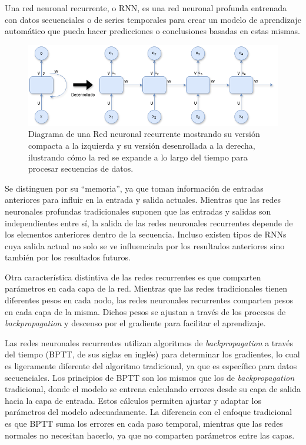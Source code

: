 Una red neuronal recurrente, o RNN, es una red neuronal profunda entrenada con datos secuenciales o de series temporales para crear un modelo de aprendizaje automático que pueda hacer predicciones o conclusiones basadas en estas mismas.

\begin{figure}[H]
    \centering
    \includegraphics[width=1\textwidth]{imagenes/RNN.drawio.png}
    \caption{Diagrama de una Red neuronal recurrente mostrando su versión compacta a la izquierda y su versión desenrollada a la derecha, ilustrando cómo la red se expande a lo largo del tiempo para procesar secuencias de datos.}
    \label{fig:rnn}
\end{figure}

Se distinguen por su “memoria”, ya que toman información de entradas anteriores para influir en la entrada y salida actuales. Mientras que las redes neuronales profundas tradicionales suponen que las entradas y salidas son independientes entre sí, la salida de las redes neuronales recurrentes depende de los elementos anteriores dentro de la secuencia. Incluso existen tipos de RNNs cuya salida actual no solo se ve influenciada por los resultados anteriores sino también por los resultados futuros.

Otra característica distintiva de las redes recurrentes es que comparten parámetros en cada capa de la red. Mientras que las redes tradicionales tienen diferentes pesos en cada nodo, las redes neuronales recurrentes comparten pesos en cada capa de la misma. Dichos pesos se ajustan a través de los procesos de \textit{backpropagation} y descenso por el gradiente para facilitar el aprendizaje.

Las redes neuronales recurrentes utilizan algoritmos de \textit{backpropagation} a través del tiempo (BPTT, de sus siglas en inglés) para determinar los gradientes, lo cual es ligeramente diferente del algoritmo tradicional, ya que es específico para datos secuenciales. Los principios de BPTT son los mismos que los de \textit{backpropagation} tradicional, donde el modelo se entrena calculando errores desde su capa de salida hacia la capa de entrada. Estos cálculos permiten ajustar y adaptar los parámetros del modelo adecuadamente. La diferencia con el enfoque tradicional es que BPTT suma los errores en cada paso temporal, mientras que las redes normales no necesitan hacerlo, ya que no comparten parámetros entre las capas.

